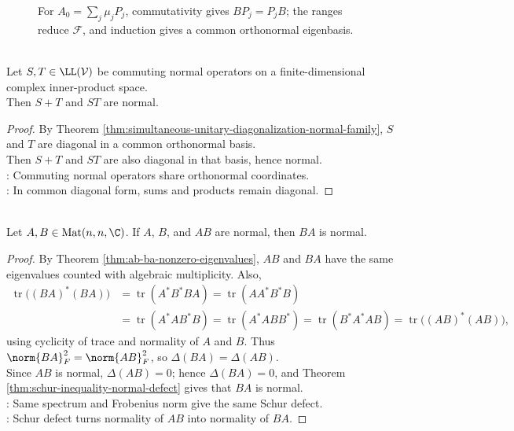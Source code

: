 \begin{figure}[H]
  \centering
  
  \caption{For $A_0=\sum_j\mu_jP_j$, commutativity gives $BP_j=P_jB$; the ranges reduce $\mathcal{F}$, and induction gives a common orthonormal eigenbasis.}
  \label{fig:simultaneous-normal-diagonalization}
\end{figure}

\begin{corollary} \label{cor:commuting-normal-sums-products-normal} \\
Let $S,T\in\LL(\mathcal{V})$ be commuting normal operators on a finite-dimensional complex inner-product space.\\
Then $S+T$ and $ST$ are normal.
\begin{proof}
By Theorem \ref{thm:simultaneous-unitary-diagonalization-normal-family}, $S$ and $T$ are diagonal in a common orthonormal basis.\\
Then $S+T$ and $ST$ are also diagonal in that basis, hence normal.\\
: Commuting normal operators share orthonormal coordinates.\\
: In common diagonal form, sums and products remain diagonal.
\end{proof}
\end{corollary}

\begin{theorem} \label{thm:normality-transfer-ab-ba} \\
Let $A,B\in\operatorname{Mat}(n,n,\C)$. If $A$, $B$, and $AB$ are normal, then $BA$ is normal.
\begin{proof}
By Theorem \ref{thm:ab-ba-nonzero-eigenvalues}, $AB$ and $BA$ have the same eigenvalues counted with algebraic multiplicity. Also,
\begin{align}
\operatorname{tr}\bigl((BA)^*(BA)\bigr) &=\operatorname{tr}(A^*B^*BA) =\operatorname{tr}(AA^*B^*B) \nonumber\\
&=\operatorname{tr}(A^*AB^*B) =\operatorname{tr}(A^*A BB^*) =\operatorname{tr}(B^*A^*AB) =\operatorname{tr}\bigl((AB)^*(AB)\bigr),
\nonumber
\end{align}
using cyclicity of trace and normality of $A$ and $B$. Thus $\norm{BA}_F^2=\norm{AB}_F^2$, so $\Delta(BA)=\Delta(AB)$.\\
Since $AB$ is normal, $\Delta(AB)=0$; hence $\Delta(BA)=0$, and Theorem \ref{thm:schur-inequality-normal-defect} gives that $BA$ is normal.\\
: Same spectrum and Frobenius norm give the same Schur defect.\\
: Schur defect turns normality of $AB$ into normality of $BA$.
\end{proof}
\end{theorem}

